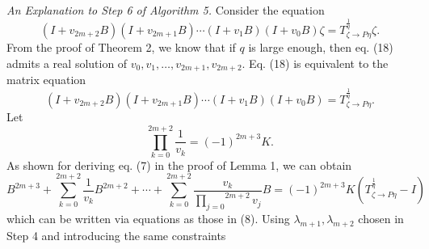 \documentclass[journal,a4paper,12pt,onecolumn]{IEEEtran}
\begin{document}
$\left. {}\right. $

\emph{An Explanation to Step 6 of Algorithm 5.} Consider the equation\begin{equation}
\left( I+v_{2m+2}B\right) \left( I+v_{2m+1}B\right) \cdots \left(
I+v_{1}B\right) \left( I+v_{0}B\right) \zeta =T_{\zeta \rightarrow P\eta }^{\frac{1}{q}}\zeta .
\end{equation}From the proof of Theorem 2, we know that if $q$ is large enough, then eq.
(18) admits a real solution of $v_{0},v_{1},\ldots ,v_{2m+1},v_{2m+2}$. Eq.
(18) is equivalent to the matrix equation\begin{equation*}
\left( I+v_{2m+2}B\right) \left( I+v_{2m+1}B\right) \cdots \left(
I+v_{1}B\right) \left( I+v_{0}B\right) =T_{\zeta \rightarrow P\eta }^{\frac{1}{q}}.
\end{equation*}Let\begin{equation}
\overset{2m+2}{\underset{k=0}{\prod }}\frac{1}{v_{k}}=\left( -1\right)
^{2m+3}K.
\end{equation}As shown for deriving eq. (7) in the proof of Lemma 1, we can obtain\begin{equation*}
B^{2m+3}+\overset{2m+2}{\underset{k=0}{\sum }}\frac{1}{v_{k}}B^{2m+2}+\cdots
+\overset{2m+2}{\underset{k=0}{\sum }}\frac{v_{k}}{\overset{2m+2}{\underset{j=0}{\prod }}v_{j}}B=\left( -1\right) ^{2m+3}K\left( T_{\zeta \rightarrow
P\eta }^{\frac{1}{q}}-I\right)
\end{equation*}which can be written via equations as those in (8). Using $\lambda
_{m+1},\lambda _{m+2}$ chosen in Step 4 and introducing the same constraints
\end{document}
